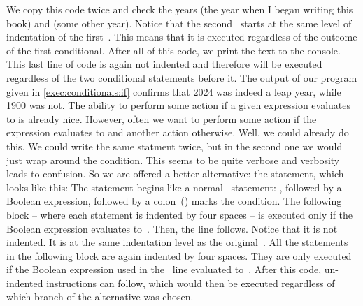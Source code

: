 We copy this code twice and check the years  (the year when I began writing this book) and  (some other year).
Notice that the second~ starts at the same level of indentation of the first~.
This means that it is executed regardless of the outcome of the first conditional.
After all of this code, we print the text  to the console.
This last line of code is again not indented and therefore will be executed regardless of the two conditional statements before it.
The output of our program given in \cref{exec:conditionals:if} confirms that 2024 was indeed a leap year, while 1900 was not.%
%
\FloatBarrier%
\endhsection%
%
%
%
%
The ability to perform some action if a given expression evaluates to  is already nice.
However, often we want to perform some action if the expression evaluates to  and another action otherwise.
Well, we could already do this.
We could write the same  statment twice, but in the second one we would just wrap  around the condition.
This seems to be quite verbose and verbosity leads to confusion.
So we are offered a better alternative: the  statement, which looks like this\cite{PSF:P3D:TPT:MCFT}:%
%
%
%
\FloatBarrier%
%
%
%
%
%
%
%
The statement begins like a normal ~statement:
, followed by a Boolean expression, followed by a colon~(\pythonilIdx{:}) marks the condition.
The following block -- where each statement is indented by four spaces -- is executed only if the Boolean expression evaluates to~.
Then, the  line follows.
Notice that it is not indented.
It is at the same indentation level as the original~.
All the statements in the following block are again indented by four spaces.
They are only executed if the Boolean expression used in the ~line evaluated to~.
After this code, un-indented instructions can follow, which would then be executed regardless of which branch of the alternative was chosen.

